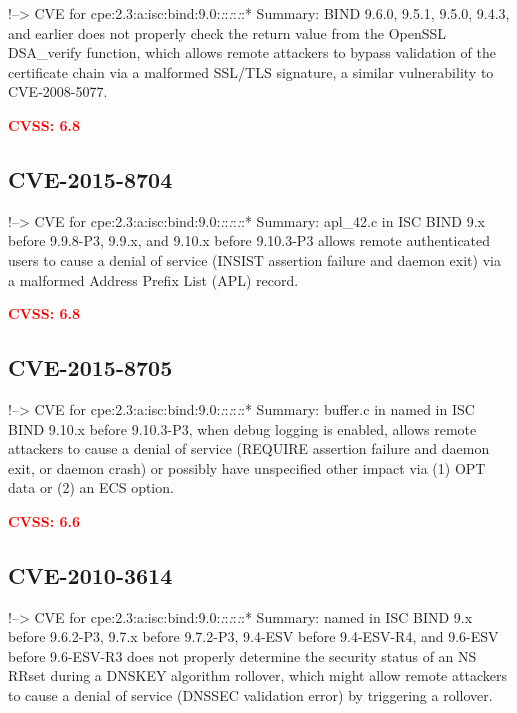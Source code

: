 \documentclass[a4paper, 12pt]{article}
\begin{document}
!--\textgreater{} CVE for
cpe:2.3:a:isc:bind:9.0:\emph{:}:\emph{:}:\emph{:}:* Summary: BIND 9.6.0,
9.5.1, 9.5.0, 9.4.3, and earlier does not properly check the return
value from the OpenSSL DSA\_verify function, which allows remote
attackers to bypass validation of the certificate chain via a malformed
SSL/TLS signature, a similar vulnerability to CVE-2008-5077.

\textbf{\textcolor{red}{CVSS: 6.8}}

\hypertarget{cve-2015-8704}{%
\subsection{CVE-2015-8704}\label{cve-2015-8704}}

!--\textgreater{} CVE for
cpe:2.3:a:isc:bind:9.0:\emph{:}:\emph{:}:\emph{:}:* Summary: apl\_42.c
in ISC BIND 9.x before 9.9.8-P3, 9.9.x, and 9.10.x before 9.10.3-P3
allows remote authenticated users to cause a denial of service (INSIST
assertion failure and daemon exit) via a malformed Address Prefix List
(APL) record.

\textbf{\textcolor{red}{CVSS: 6.8}}

\hypertarget{cve-2015-8705}{%
\subsection{CVE-2015-8705}\label{cve-2015-8705}}

!--\textgreater{} CVE for
cpe:2.3:a:isc:bind:9.0:\emph{:}:\emph{:}:\emph{:}:* Summary: buffer.c in
named in ISC BIND 9.10.x before 9.10.3-P3, when debug logging is
enabled, allows remote attackers to cause a denial of service (REQUIRE
assertion failure and daemon exit, or daemon crash) or possibly have
unspecified other impact via (1) OPT data or (2) an ECS option.

\textbf{\textcolor{red}{CVSS: 6.6}}

\hypertarget{cve-2010-3614}{%
\subsection{CVE-2010-3614}\label{cve-2010-3614}}

!--\textgreater{} CVE for
cpe:2.3:a:isc:bind:9.0:\emph{:}:\emph{:}:\emph{:}:* Summary: named in
ISC BIND 9.x before 9.6.2-P3, 9.7.x before 9.7.2-P3, 9.4-ESV before
9.4-ESV-R4, and 9.6-ESV before 9.6-ESV-R3 does not properly determine
the security status of an NS RRset during a DNSKEY algorithm rollover,
which might allow remote attackers to cause a denial of service (DNSSEC
validation error) by triggering a rollover.
\end{document}
